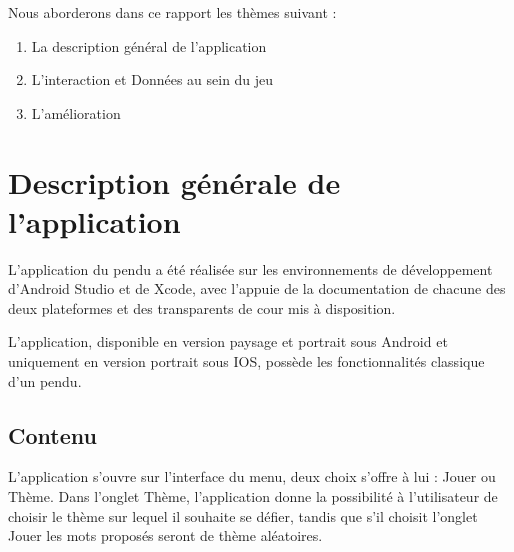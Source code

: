 \documentclass{article}
\begin{document}
Nous aborderons dans ce rapport les thèmes suivant : 
\begin{enumerate}
    \item  La description général de l'application
    \item  L'interaction et Données au sein du jeu
     \item  L'amélioration
    
\end{enumerate}





\section{Description générale de l'application}
L'application du pendu a été réalisée sur les environnements de développement d'Android Studio et de Xcode, avec l'appuie de la documentation de chacune des deux plateformes \cite{android} \cite{xcode} et des transparents de cour mis à disposition. 

L'application, disponible en version paysage et portrait sous Android et uniquement en version portrait sous IOS, possède les fonctionnalités classique d'un pendu.

\subsection{Contenu}

L'application s'ouvre sur l'interface du menu, deux choix s'offre à lui : Jouer ou Thème. Dans l'onglet Thème, l'application donne la possibilité à l'utilisateur de choisir le thème sur lequel il souhaite se défier, tandis que s'il choisit l'onglet Jouer les mots proposés seront de thème aléatoires.
\end{document}
